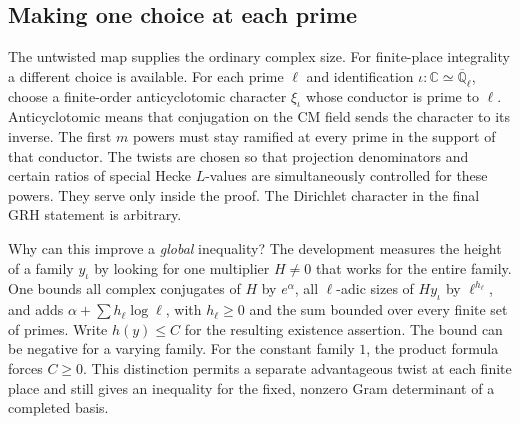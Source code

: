 \documentclass[11pt,letterpaper]{article}
\begin{document}
\subsection{Making one choice at each prime}
The untwisted map supplies the ordinary complex size. For finite-place integrality a different choice is available. For each prime $\ell$ and identification $\iota:\mathbb C\simeq\overline{\mathbb Q}_\ell$, choose a finite-order anticyclotomic character $\xi_\iota$ whose conductor is prime to $\ell$. Anticyclotomic means that conjugation on the CM field sends the character to its inverse. The first $m$ powers must stay ramified at every prime in the support of that conductor. The twists are chosen so that projection denominators and certain ratios of special Hecke $L$-values are simultaneously controlled for these powers. They serve only inside the proof. The Dirichlet character in the final GRH statement is arbitrary.

Why can this improve a \emph{global} inequality? The development measures the height of a family $y_\iota$ by looking for one multiplier $H\ne0$ that works for the entire family. One bounds all complex conjugates of $H$ by $e^\alpha$, all $\ell$-adic sizes of $H y_\iota$ by $\ell^{h_\ell}$, and adds $\alpha+\sum h_\ell\log\ell$, with $h_\ell\geq0$ and the sum bounded over every finite set of primes. Write $h(y)\le C$ for the resulting existence assertion. The bound can be negative for a varying family. For the constant family $1$, the product formula forces $C\geq0$. This distinction permits a separate advantageous twist at each finite place and still gives an inequality for the fixed, nonzero Gram determinant of a completed basis.
\end{document}
